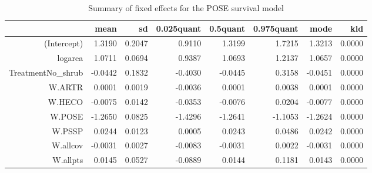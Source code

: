 \documentclass[11pt]{article}
\begin{document}
\begin{table}[ht]
\centering
\caption{Summary of fixed effects for the POSE survival model} 
\label{POSEsurvival}
\begin{tabular}{rrrrrrrr}
  \hline
 & mean & sd & 0.025quant & 0.5quant & 0.975quant & mode & kld \\ 
  \hline
(Intercept) & 1.3190 & 0.2047 & 0.9110 & 1.3199 & 1.7215 & 1.3213 & 0.0000 \\ 
  logarea & 1.0711 & 0.0694 & 0.9387 & 1.0693 & 1.2137 & 1.0657 & 0.0000 \\ 
  TreatmentNo\_shrub & -0.0442 & 0.1832 & -0.4030 & -0.0445 & 0.3158 & -0.0451 & 0.0000 \\ 
  W.ARTR & 0.0001 & 0.0019 & -0.0036 & 0.0001 & 0.0038 & 0.0001 & 0.0000 \\ 
  W.HECO & -0.0075 & 0.0142 & -0.0353 & -0.0076 & 0.0204 & -0.0077 & 0.0000 \\ 
  W.POSE & -1.2650 & 0.0825 & -1.4296 & -1.2641 & -1.1053 & -1.2624 & 0.0000 \\ 
  W.PSSP & 0.0244 & 0.0123 & 0.0005 & 0.0243 & 0.0486 & 0.0242 & 0.0000 \\ 
  W.allcov & -0.0031 & 0.0027 & -0.0083 & -0.0031 & 0.0022 & -0.0031 & 0.0000 \\ 
  W.allpts & 0.0145 & 0.0527 & -0.0889 & 0.0144 & 0.1181 & 0.0143 & 0.0000 \\ 
   \hline
\end{tabular}
\end{table}
\end{document}

